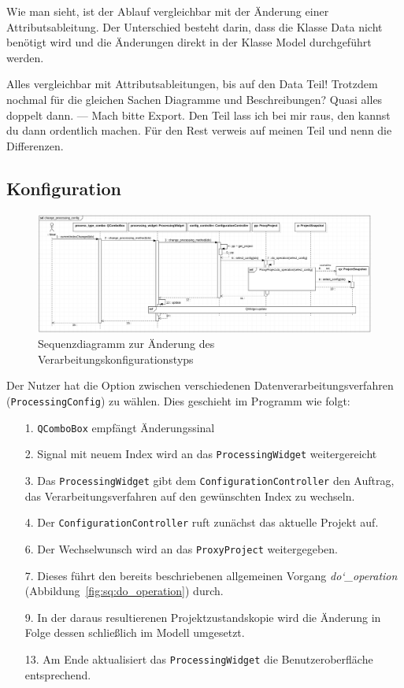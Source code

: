\documentclass{article}
\begin{document}
Wie man sieht, ist der Ablauf vergleichbar mit der Änderung einer Attributsableitung. Der Unterschied besteht darin, dass die Klasse Data nicht benötigt wird und die Änderungen direkt in der Klasse Model durchgeführt werden.

Alles vergleichbar mit Attributsableitungen, bis auf den Data Teil!
Trotzdem nochmal für die gleichen Sachen Diagramme und Beschreibungen? Quasi alles doppelt dann. --- Mach bitte Export. Den Teil lass ich bei mir raus, den kannst du dann ordentlich machen. Für den Rest verweis auf meinen Teil und nenn die Differenzen.


\subsection{Konfiguration}
\begin{figure}[H]%
    \centering
    \includegraphics[width=13cm]{entwurf/Entwurf_dokument/img/Michael/sd_change_processing_config.png}
    \caption{Sequenzdiagramm zur Änderung des Verarbeitungskonfigurationstyps}
    \label{fig:sq:ChangeProcessingConfig}
\end{figure}

Der Nutzer hat die Option zwischen verschiedenen Datenverarbeitungsverfahren (\texttt{ProcessingConfig}) zu wählen. Dies geschieht im Programm wie folgt:
\begin{enumerate}
    \item[1.] \texttt{QComboBox} empfängt Änderungssinal
    \item[2.] Signal mit neuem Index wird an das \texttt{ProcessingWidget} weitergereicht
    \item[3.] Das \texttt{ProcessingWidget} gibt dem \texttt{ConfigurationController} den Auftrag, das Verarbeitungsverfahren auf den gewünschten Index zu wechseln.
    \item[4.] Der \texttt{ConfigurationController} ruft zunächst das aktuelle Projekt auf.
    \item[6.] Der Wechselwunsch wird an das \texttt{ProxyProject} weitergegeben.
    \item[7.] Dieses führt den bereits beschriebenen allgemeinen Vorgang \emph{do\char`_operation} (Abbildung~\ref{fig:sq:do_operation}) durch.
    \item[9.] In der daraus resultierenen Projektzustandskopie wird die Änderung in Folge dessen schließlich im Modell umgesetzt.
    \item[13.] Am Ende aktualisiert das \texttt{ProcessingWidget} die Benutzeroberfläche entsprechend.
\end{enumerate}
\end{document}
